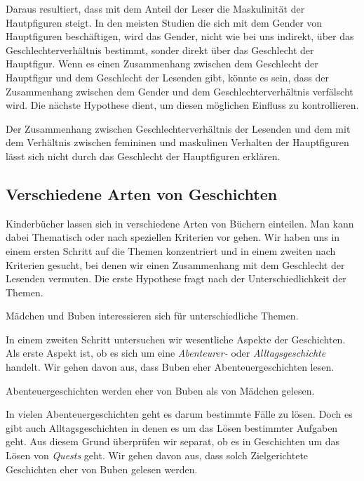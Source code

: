 Daraus resultiert, dass mit dem Anteil der Leser die Maskulinität der
Hautpfiguren steigt. In den meisten Studien die sich mit dem Gender von
Hauptfiguren beschäftigen, wird das Gender, nicht wie bei uns indirekt,
über das Geschlechterverhältnis bestimmt, sonder direkt über das
Geschlecht der Hauptfigur. Wenn es einen Zusammenhang zwischen dem
Geschlecht der Hauptfigur und dem Geschlecht der Lesenden gibt, könnte
es sein, dass der Zusammenhang zwischen dem Gender und dem
Geschlechterverhältnis verfälscht wird. Die nächste Hypothese dient, um
diesen möglichen Einfluss zu kontrollieren.

\begin{subhyp}\label{h3.2}
    Der Zusammenhang zwischen Geschlechterverhältnis der Lesenden und dem
    mit dem Verhältnis zwischen femininen und maskulinen Verhalten der Hauptfiguren lässt sich nicht durch das Geschlecht der Hauptfiguren erklären.
\end{subhyp}

\subsection{Verschiedene Arten von Geschichten}

Kinderbücher lassen sich in verschiedene Arten von Büchern einteilen.
Man kann dabei Thematisch oder nach speziellen Kriterien vor gehen. Wir
haben uns in einem ersten Schritt auf die Themen konzentriert und in
einem zweiten nach Kriterien gesucht, bei denen wir einen Zusammenhang
mit dem Geschlecht der Lesenden vermuten. Die erste Hypothese fragt nach
der Unterschiedlichkeit der Themen.

\begin{hyp}\label{hyp:themen}
    Mädchen und Buben interessieren sich für unterschiedliche Themen.
\end{hyp}

In einem zweiten Schritt untersuchen wir wesentliche Aspekte der
Geschichten. Als erste Aspekt ist, ob es sich um eine \emph{Abenteurer-}
oder \emph{Alltagsgeschichte} handelt. Wir gehen davon aus, dass Buben
eher Abenteuergeschichten lesen.

\begin{subhyp}\label{h4.1}
   Abenteuergeschichten werden eher von Buben als von Mädchen gelesen.
\end{subhyp}

In vielen Abenteuergeschichten geht es darum bestimmte Fälle zu lösen.
Doch es gibt auch Alltagsgeschichten in denen es um das Lösen bestimmter
Aufgaben geht. Aus diesem Grund überprüfen wir separat, ob es in
Geschichten um das Lösen von \emph{Quests} geht. Wir gehen davon aus,
dass solch Zielgerichtete Geschichten eher von Buben gelesen werden.

